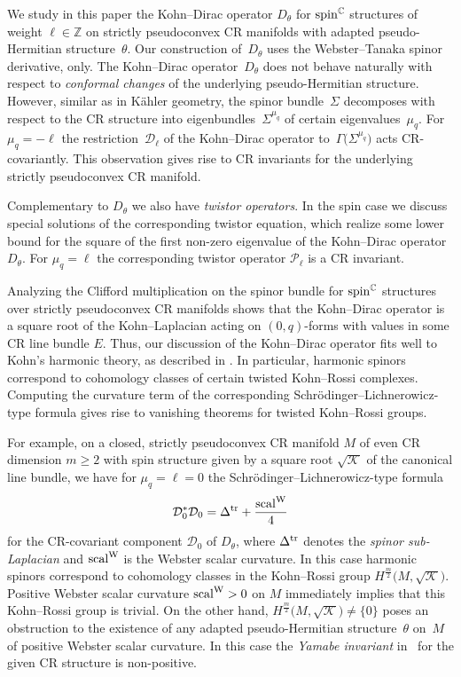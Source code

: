 \documentclass[10pt,a4paper]{amsart}
\numberwithin{equation}{section}
\newcommand{\ZZ}{\mathbb{Z}}
\newcommand{\CC}{\mathbb{C}}
\begin{document}
We study in this paper the Kohn--Dirac operator $D_\theta$ for ${\rm spin}^\CC$ structures of weight \mbox{$\ell\in\ZZ$}
on strictly pseudoconvex CR manifolds with adapted pseudo-Hermitian
structure~$\theta$. Our construction of~$D_\theta$ uses the Webster--Tanaka spinor derivative, only.
The Kohn--Dirac operator~$D_\theta$ does not behave naturally with respect to {\em conformal changes}
of the underlying pseudo-Hermitian structure. However, similar as in K\"ahler geometry, the spinor bundle~$\Sigma$ decomposes with respect to the CR structure
into eigenbundles~$\Sigma^{\mu_q}$
of certain eigenvalues~$\mu_q$. For $\mu_q=-\ell$ the restriction~$\mathcal{D}_\ell$ of the Kohn--Dirac operator to~$\Gamma\big(\Sigma^{\mu_q}\big)$
acts CR-covariantly.
This observation gives rise to CR invariants for the underlying strictly pseudoconvex CR manifold.

Complementary to $D_\theta$ we also have {\em twistor operators}.
In the spin case \cite{LeiN1} we discuss special solutions of the corresponding twistor equation, which realize
some lower bound for the square of the first non-zero eigenvalue of the Kohn--Dirac operator $D_\theta$.
For $\mu_q=\ell$ the corresponding twistor operator $\mathcal{P}_\ell$ is a CR invariant.

Analyzing the Clifford multiplication on the spinor bundle for ${\rm spin}^\CC$ structures over strictly pseudoconvex CR manifolds
shows that the Kohn--Dirac operator is a square root of the Kohn--Laplacian acting on $(0,q)$-forms with values in some CR line bundle $E$.
Thus, our discussion of the Kohn--Dirac operator fits well to Kohn's harmonic theory, as described in \cite{Tan}.
In particular, harmonic spinors correspond to cohomology classes of certain twisted Kohn--Rossi complexes. Computing the curvature term of
the corresponding Schr\"odinger--Lichnerowicz-type formula gives rise to vanishing theorems for twisted Kohn--Rossi groups.

For example,
on a closed, strictly pseudoconvex CR manifold $M$ of even CR dimension $m\geq 2$ with spin structure given by a square root $\sqrt{\mathcal{K}}$
of the canonical line bundle,
we have for $\mu_q=\ell=0$ the Schr\"odinger--Lichnerowicz-type formula
\[
\mathcal{D}_0^*\mathcal{D}_0 = \Delta^{\rm tr} + \frac{{\rm scal}^{\rm W}}{4}
\]
for the CR-covariant component $\mathcal{D}_0$ of $D_\theta$,
where $\Delta^{\rm tr}$ denotes the {\em spinor sub-Laplacian} and ${\rm scal}^{\rm W}$ is the Webster scalar curvature.
In this case harmonic spinors correspond to cohomology classes in the
Kohn--Rossi group $H^{\frac{m}{2}}\big(M,\sqrt{\mathcal{K}}\big)$.
Positive Webster scalar curvature ${\rm scal}^{\rm W}>0$ on $M$ immediately implies that this Kohn--Rossi group is trivial.
On the other hand, \mbox{$H^{\frac{m}{2}}\big(M,\sqrt{\mathcal{K}}\big)\neq\{0\}$} poses an obstruction to the existence of any
adapted pseudo-Hermitian structure~$\theta$ on~$M$ of positive Webster scalar curvature.
In this case the {\em Yamabe invariant} in~\cite{JL} for the given CR structure is non-positive.
\end{document}
